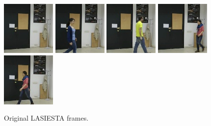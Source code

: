 \setcounter{subfigure}{0}
\renewcommand\thesubfigure{\roman{subfigure}}
\begin{subfigure}[t]{0.9\textwidth}
    \centering
    \includegraphics[scale=0.7]{figures/lasiesta/frame0}
    \hfill
    \includegraphics[scale=0.7]{figures/lasiesta/frame100}
    \hfill
    \includegraphics[scale=0.7]{figures/lasiesta/frame190}
    \hfill
    \includegraphics[scale=0.7]{figures/lasiesta/frame250}
    \hfill
    \includegraphics[scale=0.7]{figures/lasiesta/frame270}
    \caption{Original LASIESTA frames.}
\end{subfigure}%
\\ \bigskip
